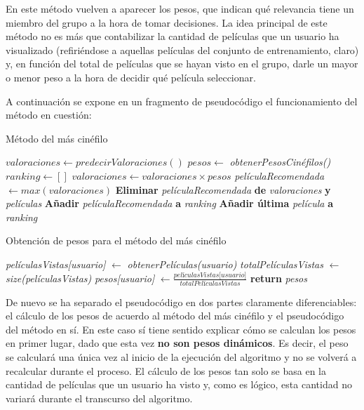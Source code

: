 En este método vuelven a aparecer los pesos, que indican qué relevancia tiene un miembro del grupo a la hora de tomar decisiones. La idea principal de este método no es más que contabilizar la cantidad de películas que un usuario ha visualizado (refiriéndose a aquellas películas del conjunto de entrenamiento, claro) y, en función del total de películas que se hayan visto en el grupo, darle un mayor o menor peso a la hora de decidir qué película seleccionar.

A continuación se expone en un fragmento de pseudocódigo el funcionamiento del método en cuestión:

\begin{algorithm}
	\caption{Método del más cinéfilo}
	\begin{algorithmic}[1]
		\State $valoraciones \gets predecirValoraciones()$
		\State $pesos \gets $ \textit{obtenerPesosCinéfilos()}
		\State $ranking \gets []$
		\State $valoraciones \gets valoraciones \times pesos$
		\State \textit{películaRecomendada} $ \gets max(valoraciones)$
		\State \textbf{Eliminar} \textit{películaRecomendada} \textbf{de} \textit{valoraciones} \textbf{y} \textit{películas}
		\State \textbf{Añadir} \textit{películaRecomendada} \textbf{a} \textit{ranking}
		\EndWhile
		\State \textbf{Añadir última} \textit{película} \textbf{a} \textit{ranking}
	\end{algorithmic}
\end{algorithm}

\begin{algorithm}
	\caption{Obtención de pesos para el método del más cinéfilo}
	\begin{algorithmic}[1]
		\State \textit{películasVistas[usuario]} $\gets$ \textit{obtenerPelículas(usuario)} 
		\EndFor
		\State \textit{totalPelículasVistas} $\gets$ \textit{size(películasVistas)}
		\State \textit{pesos[usuario]} $\gets \frac{\textit{películasVistas[usuario]}}{\textit{totalPelículasVistas}}$
		\EndFor
		\State \textbf{return} \textit{pesos}
	\end{algorithmic}
\end{algorithm}

De nuevo se ha separado el pseudocódigo en dos partes claramente diferenciables: el cálculo de los pesos de acuerdo al método del más cinéfilo y el pseudocódigo del método en sí. En este caso sí tiene sentido explicar cómo se calculan los pesos en primer lugar, dado que esta vez \textbf{no son pesos dinámicos}. Es decir, el peso se calculará una única vez al inicio de la ejecución del algoritmo y no se volverá a recalcular durante el proceso. El cálculo de los pesos tan solo se basa en la cantidad de películas que un usuario ha visto y, como es lógico, esta cantidad no variará durante el transcurso del algoritmo.

